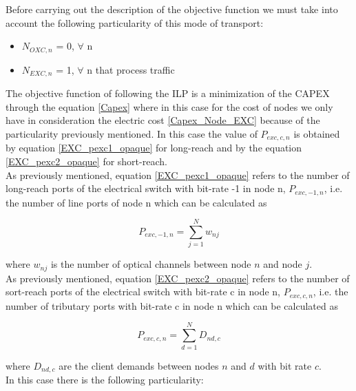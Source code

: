 Before carrying out the description of the objective function we must take into account the following particularity of this mode of transport:
\begin{itemize}
  \item $N_{OXC,n}$ = 0, \quad $\forall$ n
  \item $N_{EXC,n}$ = 1, \quad $\forall$ n that process traffic
\end{itemize}

\vspace{11pt}
The objective function of following the ILP is a minimization of the CAPEX through the equation \ref{Capex} where in this case for the cost of nodes we only have in consideration the electric cost \ref{Capex_Node_EXC} because of the particularity previously mentioned.
In this case the value of $P_{exc,c,n}$ is obtained by equation \ref{EXC_pexc1_opaque} for long-reach and by the equation \ref{EXC_pexc2_opaque} for short-reach.\\

\newpage
As previously mentioned, equation \ref{EXC_pexc1_opaque} refers to the number of long-reach ports of the electrical switch with bit-rate -1 in node n, $P_{exc,-1,n}$, i.e. the number of line ports of node n which can be calculated as

\begin{equation}
P_{exc,-1,n} = \sum_{j=1}^{N} w_{nj}
\label{EXC_pexc1_opaque}
\end{equation}
\vspace{11pt}

\noindent
where $w_{nj}$ is the number of optical channels between node $n$ and node $j$.\\

As previously mentioned, equation \ref{EXC_pexc2_opaque} refers to the number of sort-reach ports of the electrical switch with bit-rate c in node n, $P_{exc,c,n}$, i.e. the number of tributary ports with bit-rate c in node n which can be calculated as

\begin{equation}
P_{exc,c,n} = \sum_{d=1}^{N} D_{nd,c}
\label{EXC_pexc2_opaque}
\end{equation}

\vspace{11pt}
\noindent
where $D_{nd,c}$ are the client demands between nodes $n$ and $d$ with bit rate $c$.\\

In this case there is the following particularity:


